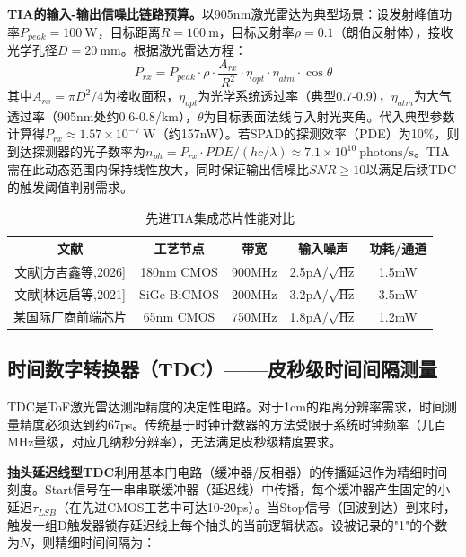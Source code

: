 \documentclass[12pt,a4paper,openany,UTF8]{ctexbook}
\begin{document}
\textbf{TIA的输入-输出信噪比链路预算。}以905nm激光雷达为典型场景：设发射峰值功率$P_{peak} = 100\ \text{W}$，目标距离$R = 100\ \text{m}$，目标反射率$\rho = 0.1$（朗伯反射体），接收光学孔径$D = 20\ \text{mm}$。根据激光雷达方程：
\begin{equation}\label{eq:lidar_eq}
P_{rx} = P_{peak} \cdot \rho \cdot \frac{A_{rx}}{R^2} \cdot \eta_{opt} \cdot \eta_{atm} \cdot \cos\theta
\end{equation}
其中$A_{rx} = \pi D^2/4$为接收面积，$\eta_{opt}$为光学系统透过率（典型0.7-0.9），$\eta_{atm}$为大气透过率（905nm处约0.6-0.8/km），$\theta$为目标表面法线与入射光夹角。代入典型参数计算得$P_{rx} \approx 1.57 \times 10^{-7}\ \text{W}$（约157nW）。若SPAD的探测效率（PDE）为10\%，则到达探测器的光子数率为$n_{ph} = P_{rx} \cdot PDE / (hc/\lambda) \approx 7.1 \times 10^{10}\ \text{photons/s}$。TIA需在此动态范围内保持线性放大，同时保证输出信噪比$SNR \geq 10$以满足后续TDC的触发阈值判别需求。

\begin{table}[htbp]
\centering
\caption{先进TIA集成芯片性能对比}
\label{tab:tia_comparison}
\begin{tabular}{ccccc}
\toprule
\textbf{文献} & \textbf{工艺节点} & \textbf{带宽} & \textbf{输入噪声} & \textbf{功耗/通道} \\
\midrule
文献[方吉鑫等,2026] & 180nm CMOS & 900MHz & 2.5pA/$\sqrt{\text{Hz}}$ & 1.5mW \\
文献[林远启等,2021] & SiGe BiCMOS & 200MHz & 3.2pA/$\sqrt{\text{Hz}}$ & 3.5mW \\
某国际厂商前端芯片 & 65nm CMOS & 750MHz & 1.8pA/$\sqrt{\text{Hz}}$ & 1.2mW \\
\bottomrule
\end{tabular}
\end{table}

\subsection{时间数字转换器（TDC）——皮秒级时间间隔测量}

TDC是ToF激光雷达测距精度的决定性电路。对于1cm的距离分辨率需求，时间测量精度必须达到约67ps。传统基于时钟计数器的方法受限于系统时钟频率（几百MHz量级，对应几纳秒分辨率），无法满足皮秒级精度要求。

\textbf{抽头延迟线型TDC}利用基本门电路（缓冲器/反相器）的传播延迟作为精细时间刻度。Start信号在一串串联缓冲器（延迟线）中传播，每个缓冲器产生固定的小延迟$\tau_{LSB}$（在先进CMOS工艺中可达10-20ps）。当Stop信号（回波到达）到来时，触发一组D触发器锁存延迟线上每个抽头的当前逻辑状态。设被记录的"1"的个数为$N$，则精细时间间隔为：
\end{document}
